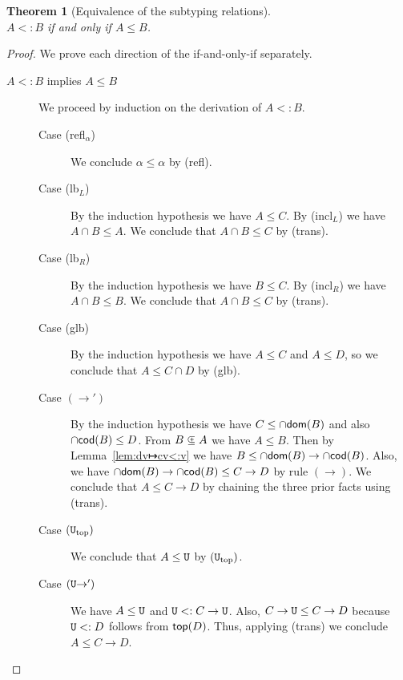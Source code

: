 \documentclass{article}
\newtheorem{theorem}{Theorem}
\begin{document}
\begin{theorem}[Equivalence of the subtyping relations]\ \\
  $A <: B$ if and only if $A \leq B$.
\end{theorem}
\begin{proof}
  We prove each direction of the if-and-only-if separately.
  \begin{description}
  \item[$A <: B$ implies $A \leq B$]
    We proceed by induction on the derivation of $A <: B$.
    \begin{description}
    \item[Case (refl$_\alpha$)] We conclude $\alpha \leq \alpha$ by (refl).      
    \item[Case (lb$_L$)] By the induction hypothesis we have $A \leq C$.
      By (incl$_L$) we have $A \cap B \leq A$. We conclude
      that $A \cap B \leq C$ by (trans).
    \item[Case (lb$_R$)] By the induction hypothesis we have $B \leq C$.
      By (incl$_R$) we have $A \cap B \leq B$. We conclude
      that $A \cap B \leq C$ by (trans).
    \item[Case (glb)] By the induction hypothesis we have
      $A \leq C$ and $A \leq D$, so we conclude that
      $A \leq C \cap D$ by (glb).
    \item[Case $(\to')$] By the induction hypothesis we have
      $C \leq \cap\mathsf{dom}(B)$ and also $\cap\mathsf{cod}(B) \leq D$.
      From $B \subsetpluseq A$ we have $A \leq B$.      
      Then by Lemma~\ref{lem:dv↦cv<:v} we have
      $B \leq \cap\mathsf{dom}(B) \to \cap\mathsf{cod}(B)$.
      Also, we have $\cap\mathsf{dom}(B) \to \cap\mathsf{cod}(B) \leq C \to D$ by rule $(\to)$.
      We conclude that $A \leq C \to D$ by chaining the three prior
      facts using (trans).
    \item[Case $(\mathtt{U}_{\mathrm{top}})$]
      We conclude that $A \leq \mathtt{U}$ by $(\mathtt{U}_{\mathrm{top}})$.
    \item[Case $(\mathtt{U}{\to}')$] We have $A \leq \mathtt{U}$ and $\mathtt{U} <: C \to
      \mathtt{U}$.  Also, $C \to \mathtt{U} \leq C \to D$ because $\mathtt{U} <: D$ follows
      from $\mathsf{top}(D)$.  Thus, applying (trans) we conclude $A \leq C \to
      D$.
    \end{description}
    

\end{description}
\end{proof}
\end{document}
